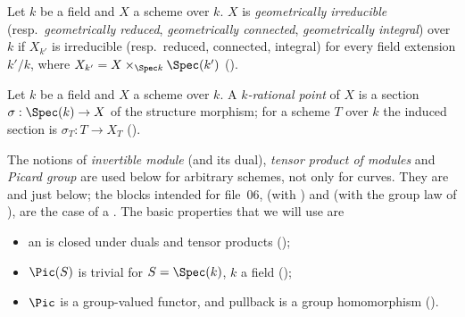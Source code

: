 \begin{definition}\label{def:pc-geometrically-irreducible}
Let $k$ be a field and $X$ a scheme over $k$.  $X$ is
\emph{geometrically irreducible} (resp.\ \emph{geometrically reduced},
\emph{geometrically connected}, \emph{geometrically integral}) over $k$
if $X_{k'}$ is irreducible (resp.\ reduced, connected, integral) for
every field extension $k'/k$, where $X_{k'}=X\times_{\Spec k}\Spec(k')$
().
\end{definition}

\begin{definition}\label{def:pc-rational-point}
Let $k$ be a field and $X$ a scheme over $k$.  A \emph{$k$-rational
point} of $X$ is a section $\sigma:\Spec(k)\to X$ of the structure
morphism; for a scheme $T$ over $k$ the induced section is
$\sigma_T:T\to X_T$ ().
\end{definition}

\begin{remark}
\label{rem:pc-sc-modules}
The notions of \emph{invertible module} (and its dual),
\emph{tensor product of modules} and \emph{Picard group} are used below
for arbitrary schemes, not only for curves.  They are
 and  just
below; the blocks intended for file~06,
 (with )
and  (with the group law of
), are the case of a
.  The basic properties that we will use
are
\begin{itemize}
\item an
 is closed under
duals and tensor products ();
\item $\Pic(S)$ is trivial for $S=\Spec(k)$, $k$ a field
();
\item $\Pic$ is a group-valued functor, and pullback is a group
homomorphism ().
\end{itemize}
\end{remark}

